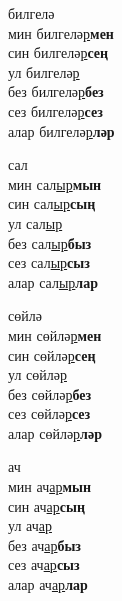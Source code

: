 \begin{multicols}{4}
\begin{enumerate}
\begin{minipage}{\linewidth}
    \item
    билгелә\\
    мин билгелә\underline{р}\textbf{мен}\\
    син билгелә\underline{р}\textbf{сең}\\
    ул билгелә\underline{р}\\
    без билгелә\underline{р}\textbf{без}\\
    сез билгелә\underline{р}\textbf{сез}\\
    алар билгелә\underline{р}\textbf{ләр}\\
\end{minipage}

\begin{minipage}{\linewidth}
    \item
    сал\\
    мин сал\underline{ыр}\textbf{мын}\\
    син сал\underline{ыр}\textbf{сың}\\
    ул сал\underline{ыр}\\
    без сал\underline{ыр}\textbf{быз}\\
    сез сал\underline{ыр}\textbf{сыз}\\
    алар сал\underline{ыр}\textbf{лар}\\
\end{minipage}

\begin{minipage}{\linewidth}
    \item
    сөйлә\\
    мин сөйлә\underline{р}\textbf{мен}\\
    син сөйлә\underline{р}\textbf{сең}\\
    ул сөйлә\underline{р}\\
    без сөйлә\underline{р}\textbf{без}\\
    сез сөйлә\underline{р}\textbf{сез}\\
    алар сөйлә\underline{р}\textbf{ләр}\\
\end{minipage}

\begin{minipage}{\linewidth}
    \item
    ач\\
    мин ач\underline{ар}\textbf{мын}\\
    син ач\underline{ар}\textbf{сың}\\
    ул ач\underline{ар}\\
    без ач\underline{ар}\textbf{быз}\\
    сез ач\underline{ар}\textbf{сыз}\\
    алар ач\underline{ар}\textbf{лар}\\
\end{minipage}


\end{enumerate}
\end{multicols}
